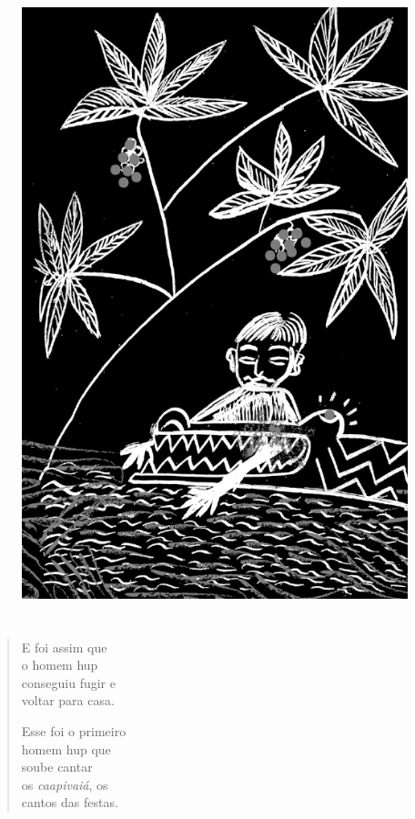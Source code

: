 \begin{figure}
\vspace*{-1.2cm}
\hspace*{-2.2cm}\includegraphics[width=138mm]{./imgs/img7.jpg}
\end{figure}

\chapter*{}

\mbox{}\vspace*{\fill}

\begin{verse}
E foi assim que\\
o homem hup\\
conseguiu fugir e\\
voltar para casa.

Esse foi o primeiro\\
homem hup que\\
soube cantar\\
os \textit{caapivaiá}, os\\
cantos das festas.
\end{verse}

